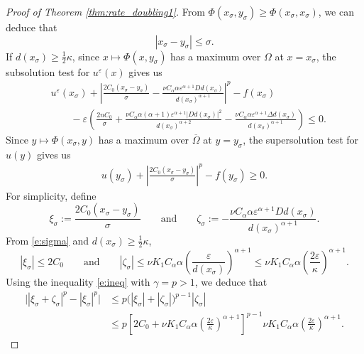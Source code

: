 \documentclass[12pt,reqno]{amsart}
\numberwithin{figure}{section}
\theoremstyle{plain}
\theoremstyle{remark}
\numberwithin{equation}{section}
\begin{document}
\begin{proof}[Proof of Theorem \ref{thm:rate_doubling1}]
From $\Phi(x_\sigma, y_\sigma) \geq \Phi(x_\sigma, x_\sigma)$, we can deduce that
\begin{equation}\label{e:sigma}
    \left| x_\sigma - y_\sigma \right| \leq \sigma.  
\end{equation}
If $ d(x_\sigma) \geq \frac{1}{2}\kappa$, since $x\mapsto \Phi(x,y_\sigma)$ has a maximum over $\Omega$ at $x=x_\sigma$, the subsolution test for $u^\varepsilon(x)$ gives us
\begin{align}\label{e:subsln}
    &u^\varepsilon(x_\sigma) + \left|\frac{2C_0(x_\sigma - y_\sigma)}{\sigma} -  \frac{\nu C_\alpha\alpha \varepsilon^{\alpha+1} D d(x_\sigma)}{d(x_\sigma)^{\alpha+1}}\right|^p - f(x_\sigma)\nonumber\\
    &\qquad -\varepsilon\left(\frac{2nC_0}{\sigma}+ \frac{\nu C_\alpha\alpha(\alpha+1) \varepsilon^{\alpha+1}|D d(x_\sigma)|^2}{d(x_\sigma)^{\alpha+2}} - \frac{\nu C_\alpha\alpha \varepsilon^{\alpha+1}\Delta d(x_\sigma)}{d(x_\sigma)^{\alpha+1}}\right) \leq 0.
\end{align}
Since $y\mapsto \Phi(x_\sigma,y)$ has a maximum over $\overline{\Omega}$ at $y = y_\sigma$, the supersolution test for $u(y)$ gives us
\begin{align}\label{e:supersln}
    u(y_\sigma) + \left|\frac{2C_0(x_\sigma - y_\sigma)}{\sigma}\right|^p - f(y_\sigma) \geq 0.
\end{align}
For simplicity, define
\begin{equation*}
    \xi_\sigma := \frac{2C_0(x_\sigma - y_\sigma)}{\sigma} \qquad\text{and}\qquad \zeta_\sigma :=- \frac{\nu C_\alpha\alpha \varepsilon^{\alpha+1} D d(x_\sigma)}{d(x_\sigma)^{\alpha+1}}.
\end{equation*}
From \eqref{e:sigma} and $d(x_\sigma) \geq \frac{1}{2}\kappa$, 
\begin{equation*}
    |\xi_\sigma|\leq 2C_0 \qquad\text{and}\qquad |\zeta_\sigma| \leq \nu K_1 C_\alpha\alpha \left(\frac{\varepsilon}{d(x_\sigma)}\right)^{\alpha+1} \leq \nu K_1 C_\alpha \alpha  \left(\frac{2\varepsilon}{\kappa}\right)^{\alpha+1}.
\end{equation*}
Using the inequality \eqref{e:ineq} with $\gamma = p > 1$, we deduce that
\begin{align}\label{e:estia}
    \Big||\xi_\sigma +\zeta_\sigma|^p - |\xi_\sigma|^p \Big| &\leq p\Big(|\xi_\sigma|+|\zeta_\sigma|\Big)^{p-1}|\zeta_\sigma|\nonumber\\
    &\leq p\left[2C_0+\nu K_1 C_\alpha\alpha \left(\frac{2\varepsilon}{\kappa}\right)^{\alpha+1}\right]^{p-1}\nu K_1 C_\alpha\alpha \left(\frac{2\varepsilon}{\kappa}\right)^{\alpha+1}.

\end{align}
\end{proof}
\end{document}
